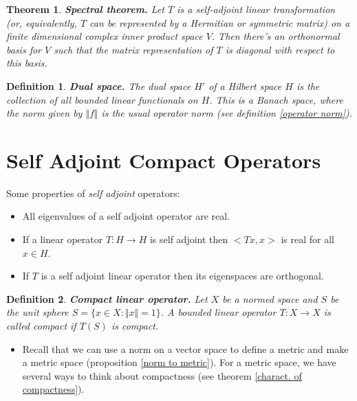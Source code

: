 \documentclass[two column]{article}
\newtheorem{theorem}{Theorem}[subsection]
\newtheorem{definition}{Definition}[subsection]
\begin{document}
\begin{theorem}
{\bf Spectral theorem.} Let $T$ is a self-adjoint linear transformation (or, equivalently, $T$ can be represented by a Hermitian or symmetric matrix) on a finite dimensional complex inner product space $V$. Then there's an orthonormal basis for $V$ such that the matrix representation of $T$ is diagonal with respect to this basis. \\
\end{theorem}

\begin{definition}
{\bf Dual space.} The dual space $H'$ of a Hilbert space $H$ is the collection of all bounded linear functionals on $H$. This is a Banach space, where the norm given by $\Vert f \Vert$ is the usual operator norm (see definition \ref{operator norm}).
\end{definition}

\section{Self Adjoint Compact Operators}

Some properties of \emph{self adjoint} operators:
\begin{itemize}
\item All eigenvalues of a self adjoint operator are real. 
\item If a linear operator $T : H \rightarrow H$ is self adjoint then $< Tx,x >$ is real for all $x \in H$. 
\item If $T$ is a self adjoint linear operator then its eigenspaces are orthogonal. \\
\end{itemize}

\begin{definition}
{\bf Compact linear operator.} Let $X$ be a normed space and $S$ be the unit sphere $S = \{ x \in X : \Vert x \Vert = 1 \}$. A bounded linear operator $T : X \rightarrow X$ is called compact if $T(S)$ is compact. 
\end{definition}
\begin{itemize}
\item Recall that we can use a norm on a vector space to define a metric and make a metric space (proposition \ref{norm to metric}). For a metric space, we have several ways to think about compactness (see theorem \ref{charact. of compactness}).  \\
\end{itemize}
\end{document}
